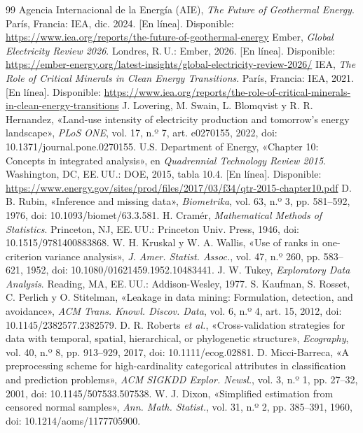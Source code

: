 \documentclass[journal,letterpaper]{IEEEtran}
\begin{document}
\begin{thebibliography}{99}
 Agencia Internacional de la Energía (AIE), \emph{The Future of Geothermal Energy}. París, Francia: IEA, dic. 2024. [En línea]. Disponible: \url{https://www.iea.org/reports/the-future-of-geothermal-energy}
 Ember, \emph{Global Electricity Review 2026}. Londres, R.\,U.: Ember, 2026. [En línea]. Disponible: \url{https://ember-energy.org/latest-insights/global-electricity-review-2026/}
 IEA, \emph{The Role of Critical Minerals in Clean Energy Transitions}. París, Francia: IEA, 2021. [En línea]. Disponible: \url{https://www.iea.org/reports/the-role-of-critical-minerals-in-clean-energy-transitions}
 J. Lovering, M. Swain, L. Blomqvist y R. R. Hernandez, «Land-use intensity of electricity production and tomorrow's energy landscape», \emph{PLoS ONE}, vol. 17, n.º 7, art. e0270155, 2022, doi: 10.1371/journal.pone.0270155.
 U.S. Department of Energy, «Chapter 10: Concepts in integrated analysis», en \emph{Quadrennial Technology Review 2015}. Washington, DC, EE.\,UU.: DOE, 2015, tabla 10.4. [En línea]. Disponible: \url{https://www.energy.gov/sites/prod/files/2017/03/f34/qtr-2015-chapter10.pdf}
 D. B. Rubin, «Inference and missing data», \emph{Biometrika}, vol. 63, n.º 3, pp. 581--592, 1976, doi: 10.1093/biomet/63.3.581.
 H. Cramér, \emph{Mathematical Methods of Statistics}. Princeton, NJ, EE.\,UU.: Princeton Univ. Press, 1946, doi: 10.1515/9781400883868.
 W. H. Kruskal y W. A. Wallis, «Use of ranks in one-criterion variance analysis», \emph{J. Amer. Statist. Assoc.}, vol. 47, n.º 260, pp. 583--621, 1952, doi: 10.1080/01621459.1952.10483441.
 J. W. Tukey, \emph{Exploratory Data Analysis}. Reading, MA, EE.\,UU.: Addison-Wesley, 1977.
 S. Kaufman, S. Rosset, C. Perlich y O. Stitelman, «Leakage in data mining: Formulation, detection, and avoidance», \emph{ACM Trans. Knowl. Discov. Data}, vol. 6, n.º 4, art. 15, 2012, doi: 10.1145/2382577.2382579.
 D. R. Roberts \emph{et al.}, «Cross-validation strategies for data with temporal, spatial, hierarchical, or phylogenetic structure», \emph{Ecography}, vol. 40, n.º 8, pp. 913--929, 2017, doi: 10.1111/ecog.02881.
 D. Micci-Barreca, «A preprocessing scheme for high-cardinality categorical attributes in classification and prediction problems», \emph{ACM SIGKDD Explor. Newsl.}, vol. 3, n.º 1, pp. 27--32, 2001, doi: 10.1145/507533.507538.
 W. J. Dixon, «Simplified estimation from censored normal samples», \emph{Ann. Math. Statist.}, vol. 31, n.º 2, pp. 385--391, 1960, doi: 10.1214/aoms/1177705900.

\end{thebibliography}
\end{document}
